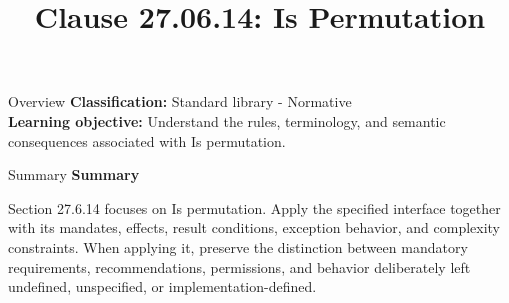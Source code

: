 \documentclass[10pt,letterpaper]{article}
\title{Clause 27.06.14: Is Permutation}
\author{}
\date{}
\begin{document}
\maketitle
\begin{CornellOverviewBox}{Overview}
\textbf{Classification:} Standard library - Normative\\[2pt]
\textbf{Learning objective:} Understand the rules, terminology, and semantic consequences associated with Is permutation.
\end{CornellOverviewBox}\begin{CornellSummaryBox}{Summary}
{\sffamily\bfseries\color{Accent} Summary}\par\vspace{3pt}Section 27.6.14 focuses on Is permutation. Apply the specified interface together with its mandates, effects, result conditions, exception behavior, and complexity constraints. When applying it, preserve the distinction between mandatory requirements, recommendations, permissions, and behavior deliberately left undefined, unspecified, or implementation-defined.
\end{CornellSummaryBox}
\end{document}
